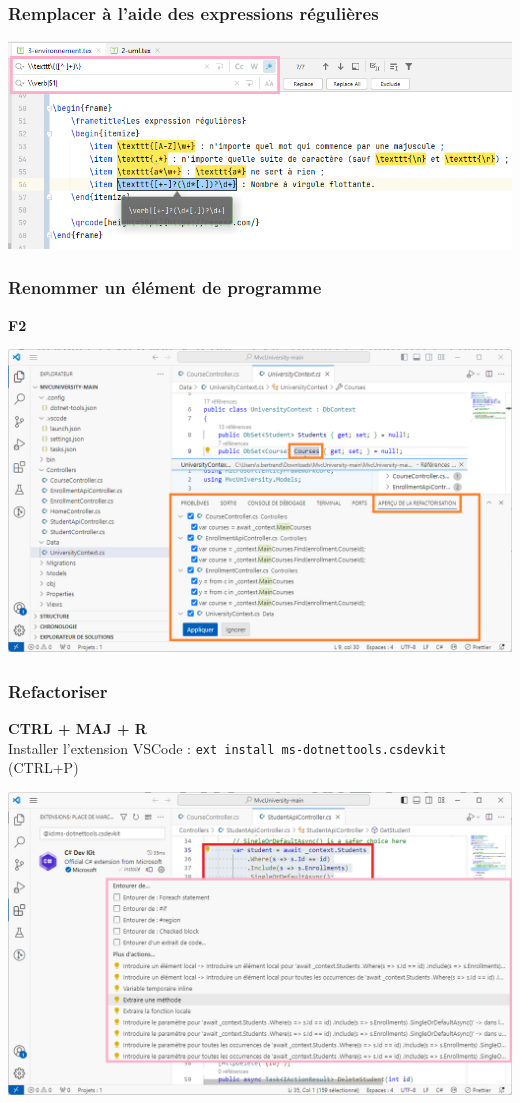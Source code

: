 \begin{frame}
    \frametitle{Remplacer à l'aide des expressions régulières}
    \centering
    \includegraphics[height=0.4\linewidth]{figures/environnement/remplacer}
\end{frame}

\begin{frame}
    \frametitle{Renommer un élément de programme}
    \centering
    \Huge
    \textbf{F2}

    \includegraphics[height=0.4\linewidth]{figures/environnement/renommer}
\end{frame}

\begin{frame}
    \frametitle{Refactoriser}
    \centering
    \Huge\textbf{CTRL + MAJ + R}\\
    \normalsize Installer l'extension VSCode : \texttt{ext install ms-dotnettools.csdevkit} (CTRL+P)

    \includegraphics[height=0.35\linewidth]{figures/environnement/refactoriser}
\end{frame}

